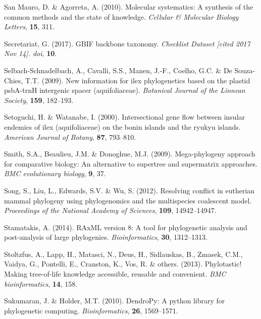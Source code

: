 \documentclass[]{article}
\begin{document}
\leavevmode\hypertarget{ref-san2010molecular}{}%
San Mauro, D. \& Agorreta, A. (2010). Molecular systematics: A synthesis of the common methods and the state of knowledge. \emph{Cellular \& Molecular Biology Letters}, \textbf{15}, 311.

\leavevmode\hypertarget{ref-secretariat2017gbif}{}%
Secretariat, G. (2017). GBIF backbone taxonomy. \emph{Checklist Dataset {[}cited 2017 Nov 14{]}. doi}, \textbf{10}.

\leavevmode\hypertarget{ref-selbach2009new}{}%
Selbach-Schnadelbach, A., Cavalli, S.S., Manen, J.-F., Coelho, G.C. \& De Souza-Chies, T.T. (2009). New information for ilex phylogenetics based on the plastid psbA-trnH intergenic spacer (aquifoliaceae). \emph{Botanical Journal of the Linnean Society}, \textbf{159}, 182--193.

\leavevmode\hypertarget{ref-setoguchi2000intersectional}{}%
Setoguchi, H. \& Watanabe, I. (2000). Intersectional gene flow between insular endemics of ilex (aquifoliaceae) on the bonin islands and the ryukyu islands. \emph{American Journal of Botany}, \textbf{87}, 793--810.

\leavevmode\hypertarget{ref-smith2009mega}{}%
Smith, S.A., Beaulieu, J.M. \& Donoghue, M.J. (2009). Mega-phylogeny approach for comparative biology: An alternative to supertree and supermatrix approaches. \emph{BMC evolutionary biology}, \textbf{9}, 37.

\leavevmode\hypertarget{ref-song2012resolving}{}%
Song, S., Liu, L., Edwards, S.V. \& Wu, S. (2012). Resolving conflict in eutherian mammal phylogeny using phylogenomics and the multispecies coalescent model. \emph{Proceedings of the National Academy of Sciences}, \textbf{109}, 14942--14947.

\leavevmode\hypertarget{ref-stamatakis2014raxml}{}%
Stamatakis, A. (2014). RAxML version 8: A tool for phylogenetic analysis and post-analysis of large phylogenies. \emph{Bioinformatics}, \textbf{30}, 1312--1313.

\leavevmode\hypertarget{ref-stoltzfus2013phylotastic}{}%
Stoltzfus, A., Lapp, H., Matasci, N., Deus, H., Sidlauskas, B., Zmasek, C.M., Vaidya, G., Pontelli, E., Cranston, K., Vos, R. \& others. (2013). Phylotastic! Making tree-of-life knowledge accessible, reusable and convenient. \emph{BMC bioinformatics}, \textbf{14}, 158.

\leavevmode\hypertarget{ref-sukumaran2010dendropy}{}%
Sukumaran, J. \& Holder, M.T. (2010). DendroPy: A python library for phylogenetic computing. \emph{Bioinformatics}, \textbf{26}, 1569--1571.
\end{document}

